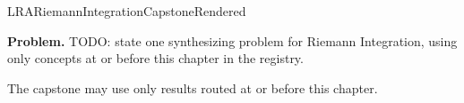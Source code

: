 \ifcsname LRARiemannIntegrationCapstoneRendered\endcsname
\else
\expandafter\gdef\csname LRARiemannIntegrationCapstoneRendered\endcsname{}

\newpage
{}
\label{cap:riemann-integration}

\begin{tcolorbox}[
  colback=gray!6,
  colframe=gray!40,
  arc=2pt,
  left=8pt, right=8pt, top=6pt, bottom=6pt,
  title={\small\textbf{Capstone Problem}},
  fonttitle=\small\bfseries
]
\textbf{Problem.}
TODO: state one synthesizing problem for Riemann Integration, using only concepts at or
before this chapter in the registry.
\end{tcolorbox}

\begin{remark*}
The capstone may use only results routed at or before this chapter.
\end{remark*}

\clearpage
\fi
